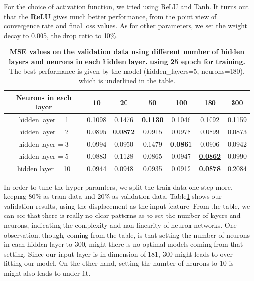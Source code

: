 \documentclass{article} %
\begin{document}
For the choice of activation function, we tried using ReLU and Tanh. It turns out that the \textbf{ReLU} gives much better performance, from the point view of convergence rate and final loss values. As for other parameters, we set the weight decay to 0.005, the drop ratio to 10\%.



\begin{table}[htbp]
	\small
	\centering
	\begin{tabular}{@{}|c|c|c|c|c|c|c|@{}} %
		\hline
		Neurons in each layer & 10 & 20 & 50 & 100 & 180 & 300\\ 
		\cline{1-7} \hline \hline
		hidden layer = 1 & 0.1098 & 0.1476 & \textbf{0.1130} & 0.1046  & 0.1092 & 0.1159 \\
		
		hidden layer = 2 & 0.0895  & \textbf{0.0872} & 0.0915 & 0.0978 & 0.0899 & 0.0873 \\ 
		hidden layer = 3 &  0.0994 & 0.0950 & 0.1479 & \textbf{0.0861} & 0.0906  & 0.0942 \\ 
		 hidden layer = 5 & 0.0883 & 0.1128 & 0.0865 & 0.0947 & \textbf{\underline{0.0862}}  & 0.0990\\ 
		 hidden layer = 10 & 0.0944 & 0.0948 & 0.0935 & 0.0912 & \textbf{0.0878} & 0.2084  \\ \hline
	\end{tabular}
	\caption{{\bf MSE values on the validation data using different number of hidden layers and neurons in each hidden layer, using 25 epoch for training.} The best performance is given by the model (hidden\_layers=5, neurons=180), which is underlined in the table.}
	\label{tab:nn_cv}
\end{table}

In order to tune the hyper-paramters, we split the train data one step more, keeping 80\% as train data and 20\% as validation data. Table\ref{tab:nn_cv} shows our validation results, using the displacement as the input feature. From the table, we can see that there is really no clear patterns as to set the number of layers and neurons, indicating the complexity and non-linearity of neuron networks. One observation, though, coming from the table, is that setting the number of neurons in each hidden layer to 300, might there is no optimal models coming from that setting. Since our input layer is in dimension of 181, 300 might leads to over-fitting our model.  On the other hand, setting the number of neurons to 10 is might also leads to under-fit.
\end{document}
